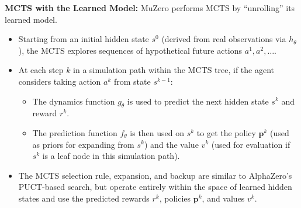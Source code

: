 \documentclass[11pt,a4paper]{article}
\begin{document}
\textbf{MCTS with the Learned Model:}
MuZero performs MCTS by ``unrolling'' its learned model.
\begin{itemize}
    \item Starting from an initial hidden state $s^0$ (derived from real observations via $h_{\theta}$), the MCTS explores sequences of hypothetical future actions $a^1, a^2, \dots$.
    \item At each step $k$ in a simulation path within the MCTS tree, if the agent considers taking action $a^k$ from state $s^{k-1}$:
        \begin{itemize}
            \item The dynamics function $g_{\theta}$ is used to predict the next hidden state $s^k$ and reward $r^k$.
            \item The prediction function $f_{\theta}$ is then used on $s^k$ to get the policy $\mathbf{p}^k$ (used as priors for expanding from $s^k$) and the value $v^k$ (used for evaluation if $s^k$ is a leaf node in this simulation path).
        \end{itemize}
    \item The MCTS selection rule, expansion, and backup are similar to AlphaZero's PUCT-based search, but operate entirely within the space of learned hidden states and use the predicted rewards $r^k$, policies $\mathbf{p}^k$, and values $v^k$.
\end{itemize}
\end{document}
